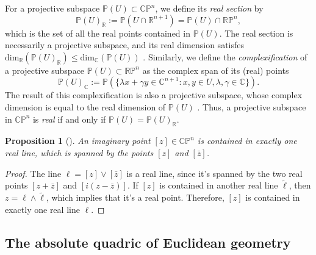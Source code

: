 \documentclass[10pt, a4paper]{article}
\theoremstyle{BoldTopSpacing}
\theoremstyle{BoldTopSpacing}
\theoremstyle{BoldTopSpacing}
\theoremstyle{BoldTopBottomSpacing}
\theoremstyle{BoldTopSpacing}
\newtheorem{proposition}{Proposition}[section]
\theoremstyle{BoldTopBottomSpacing}
\theoremstyle{remark}
\begin{document}
For a projective subspace $\mathbb{P}(U) \subset \mathbb{C}\mathbb{P}^n$, we define its \textit{real section} by
\[
    \mathbb{P}(U)_{\mathbb{R}} := \mathbb{P}(U \cap \mathbb{R}^{n+1}) = \mathbb{P}(U) \cap \mathbb{R}\mathbb{P}^n,
\]
which is the set of all the real points contained in $\mathbb{P}(U)$. The real section is necessarily a projective subspace, and its real dimension satisfes  $\text{dim}_{\mathbb{R}}\left(\mathbb{P}(U)_{\mathbb{R}}\right) \leq \text{dim}_{\mathbb{C}}\left(\mathbb{P}(U)\right)$ \cite{geometryII}.
Similarly, we define the \textit{complexification} of a projective subspace $\mathbb{P}(U) \subset \mathbb{R}\mathbb{P}^n$ as the complex span of its (real) points
\[
    \mathbb{P}(U)_{\mathbb{C}} := \mathbb{P}(\{ \lambda x + \gamma y \in \mathbb{C}^{n+1} : x, y \in U, \lambda, \gamma \in \mathbb{C} \}).
\]
The result of this complexification is also a projective subspace, whose complex dimension is equal to the real dimension of $\mathbb{P}(U)$ \cite{geometryII}. Thus, a projective subspace in $\mathbb{C}\mathbb{P}^n$ is \textit{real} if and only if $\mathbb{P}(U) = \mathbb{P}(U)_{\mathbb{R}}$. \par

\begin{proposition}[]
\label{thm:span-real-line}
An imaginary point $[z] \in \mathbb{C}\mathbb{P}^n$ is contained in exactly one real line, which is spanned by the points $[z]$ and $[\bar{z}]$.
\end{proposition}

\begin{proof}
The line $\ell = [z] \vee [\bar{z}]$ is a real line, since it's spanned by the two real points $[z + \bar{z}]$ and $[i(z - \bar{z})]$. If $[z]$ is contained in another real line $\tilde{\ell}$, then $z = \ell \wedge \tilde{\ell}$, which implies that it's a real point. Therefore, $[z]$ is contained in exactly one real line $\ell$.
\end{proof}

\subsection{The absolute quadric of Euclidean geometry}
\label{subsec:absolute-quadrics}
\end{document}

